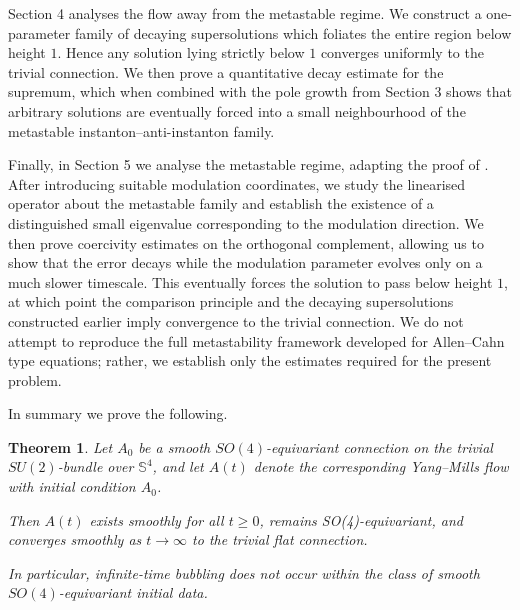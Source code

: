 \documentclass[11pt,a4paper]{article}
\numberwithin{equation}{section}
\theoremstyle{plain}
\newtheorem{theorem}{Theorem}[section]
\theoremstyle{remark}
\begin{document}
Section 4 analyses the flow away from the metastable regime. We construct a one-parameter family of decaying supersolutions which foliates the entire region below height $1$. Hence any solution lying strictly below $1$ converges uniformly to the trivial connection. We then prove a quantitative decay estimate for the supremum, which when combined with the pole growth from Section 3 shows that arbitrary solutions are eventually forced into a small neighbourhood of the metastable instanton--anti-instanton family.



Finally, in Section 5 we analyse the metastable regime, adapting the proof of \cite{carr1989metastable}. After introducing suitable modulation coordinates, we study the linearised operator about the metastable family and establish the existence of a distinguished small eigenvalue corresponding to the modulation direction. We then prove coercivity estimates on the orthogonal complement, allowing us to show that the error decays while the modulation parameter evolves only on a much slower timescale. This eventually forces the solution to pass below height $1$, at which point the comparison principle and the decaying supersolutions constructed earlier imply convergence to the trivial connection. We do not attempt to reproduce the full metastability framework developed for Allen--Cahn type equations; rather, we establish only the estimates required for the present problem.

In summary we prove the following.

\begin{theorem}\label{1.1}
Let $A_0$ be a smooth $SO(4)$-equivariant connection on the trivial $SU(2)$-bundle over $\mathbb{S}^4$, and let $A(t)$ denote the corresponding Yang--Mills flow with initial condition $A_0$.

Then $A(t)$ exists smoothly for all $t\ge0$, remains SO(4)-equivariant, and converges smoothly as $t\to\infty$ to the trivial flat connection. 

In particular, infinite-time bubbling does not occur within the class of smooth $SO(4)$-equivariant initial data.
\end{theorem}
\end{document}
